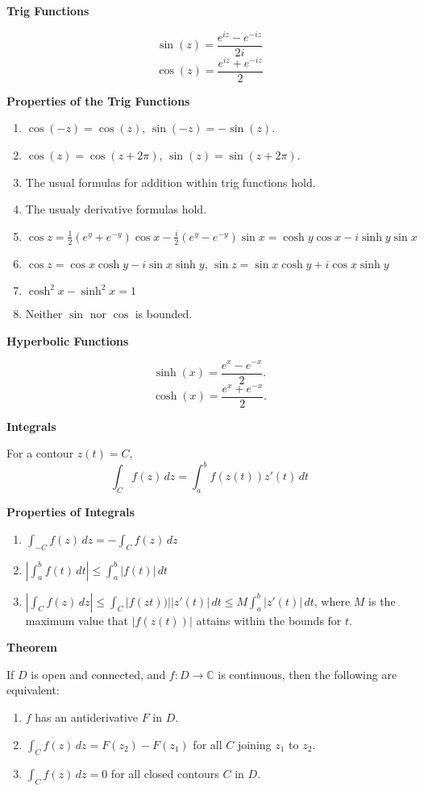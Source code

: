 \documentclass{article}
\begin{document}
\medskip\noindent\textbf{Trig Functions}

    $$\sin(z) = \frac{e^{iz} - e^{-iz}}{2i}$$
    $$\cos(z) = \frac{e^{iz}+e^{-iz}}{2}$$

\medskip\noindent\textbf{Properties of the Trig Functions}
\begin{enumerate}
    \item $\cos(-z) = \cos(z)$, $\sin(-z) = -\sin(z)$.
    \item $\cos(z) = \cos(z + 2\pi)$, $\sin(z) = \sin(z + 2\pi)$.
    \item The usual formulas for addition within trig functions hold.
    \item The usualy derivative formulas hold.
    \item $\cos z = \frac12(e^{y} + e^{-y})\cos x - \frac i2(e^y-e^{-y})\sin x = \cosh y \cos x - i\sinh y \sin x$
    \item $\cos z = \cos x \cosh y - i\sin x \sinh y$, $\sin z = \sin x \cosh y + i \cos x \sinh y$
    \item $\cosh^2 x - \sinh^2 x = 1$
    \item Neither $\sin$ nor $\cos$ is bounded.
\end{enumerate}

\medskip\noindent\textbf{Hyperbolic Functions}

    $$\sinh(x) = \frac{e^x - e^{-x}}2.$$
    $$\cosh(x) = \frac{e^x + e^{-x}}2.$$

\medskip\noindent\textbf{Integrals}
    
    For a contour $z(t) = C$,
    $$\int_{C} f(z)\,dz = \int_a^b f(z(t))z'(t)\,dt$$

\medskip\noindent\textbf{Properties of Integrals}
\begin{enumerate}
    \item $\int_{-C}f(z)\,dz = -\int_Cf(z)\,dz$
    \item $|\int_a^bf(t)\,dt| \leq \int_a^b|f(t)|\,dt$
    \item $|\int_Cf(z)\,dz| \leq \int_C |f(zt))| |z'(t)|\,dt \leq M\int_a^b|z'(t)|\,dt$, where $M$ is the maximum value that $|f(z(t))|$ attains within the bounds for $t$.
\end{enumerate}

\medskip\noindent\textbf{Theorem}

    If $D$ is open and connected, and $f: D \to \mathbb C$ is continuous, then the following are equivalent:
    \begin{enumerate}
        \item $f$ has an antiderivative $F$ in $D$.
        \item $\int_C f(z)\,dz = F(z_2) - F(z_1)$ for all $C$ joining $z_1$ to $z_2$.
        \item $\int_Cf(z)\,dz = 0$ for all closed contours $C$ in $D$.
    \end{enumerate}
\end{document}
